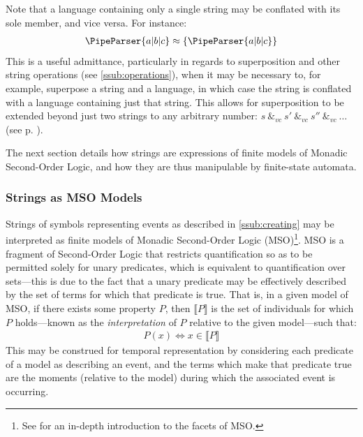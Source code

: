 \documentclass[a4paper,12pt,leqno,twoside]{article}
\newcommand{\vph}[1]{\vphantom{#1}}
\newcommand{\ebox}[1]{\fbox{$\vph{'(),}#1$}}
\newcommand{\spvc}{~\&_{v\!c}~}
\newcommand{\EventString}[1]{%
	\renewcommand*{\do}[1]{\ebox{##1}}%
	\PipeParser{#1}%
}
\begin{document}
Note that a language containing only a single string may be conflated with its sole member, and vice versa. For instance:
\begin{align}
	\EventString{a|b|c} \approx \{\EventString{a|b|c}\}
\end{align}
This is a useful admittance, particularly in regards to superposition and other string operations (see \cref{ssub:operations}), when it may be necessary to, for example, superpose a string and a language, in which case the string is conflated with a language containing just that string. This allows for superposition to be extended beyond just two strings to any arbitrary number: $s \spvc s' \spvc s'' \spvc \ldots$ (see p. \pageref{def:vc-superposition}).\label{pt:conflation}

The next section details how strings are expressions of finite models of Monadic Second-Order Logic, and how they are thus manipulable by finite-state automata.


\subsubsection{Strings as MSO Models}\label{ssub:mso}

Strings of symbols representing events as described in \cref{ssub:creating} may be interpreted as finite models of Monadic Second-Order Logic (MSO)\footnote{See \citet[ch. 7]{Libkin2004} for an in-depth introduction to the facets of MSO.}. MSO is a fragment of Second-Order Logic that restricts quantification so as to be permitted solely for unary predicates, which is equivalent to quantification over sets---this is due to the fact that a unary predicate may be effectively described by the set of terms for which that predicate is true. That is, in a given model of MSO, if there exists some property $P$, then $\llbracket P \rrbracket$ is the set of individuals for which $P$ holds---known as the \textit{interpretation} of $P$ relative to the given model---such that:
\begin{align}\label{impl:prop-interpretation}
	P(x) \Longleftrightarrow x \in \llbracket P \rrbracket
\end{align}
This may be construed for temporal representation by considering each predicate of a model as describing an event, and the terms which make that predicate true are the moments (relative to the model) during which the associated event is occurring.
\end{document}
